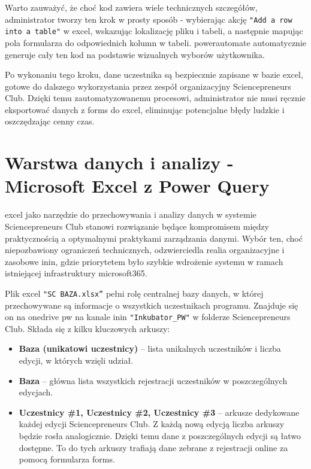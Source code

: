 Warto zauważyć, że choć kod zawiera wiele technicznych szczegółów, administrator tworzy ten krok w prosty sposób - wybierając akcję \texttt{"Add a row into a table"} w \gls{excel}, wskazując lokalizację pliku i tabeli, a następnie mapując pola formularza do odpowiednich kolumn w tabeli. \gls{powerautomate} automatycznie generuje cały ten kod na podstawie wizualnych wyborów użytkownika.

Po wykonaniu tego kroku, dane uczestnika są bezpiecznie zapisane w bazie \gls{excel}, gotowe do dalszego wykorzystania przez zespół organizacyjny Sciencepreneurs Club. Dzięki temu zautomatyzowanemu procesowi, administrator nie musi ręcznie eksportować danych z \gls{forms} do \gls{excel}, eliminując potencjalne błędy ludzkie i oszczędzając cenny czas.


\section{Warstwa danych i analizy - Microsoft Excel z Power Query}

\gls{excel} jako narzędzie do przechowywania i analizy danych w systemie Sciencepreneurs Club stanowi rozwiązanie będące kompromisem między praktycznością a optymalnymi praktykami zarządzania danymi. Wybór ten, choć niepozbawiony ograniczeń technicznych, odzwierciedla realia organizacyjne i zasobowe \gls{inin}, gdzie priorytetem było szybkie wdrożenie systemu w ramach istniejącej infrastruktury \gls{microsoft365}.

Plik \gls{excel} \texttt{"SC BAZA.xlsx”} pełni rolę centralnej bazy danych, w której przechowywane są informacje o wszystkich uczestnikach programu. Znajduje się on na \gls{onedrive} \gls{pw} na kanale \gls{inin} \texttt{"Inkubator\_PW"} w folderze Sciencepreneurs Club. Składa się z kilku kluczowych arkuszy:

\begin{itemize}
    \item \textbf{Baza (unikatowi uczestnicy)} – lista unikalnych uczestników i liczba edycji, w których wzięli udział.
    \item \textbf{Baza} – główna lista wszystkich rejestracji uczestników w poszczególnych edycjach.
    \item \textbf{Uczestnicy \#1, Uczestnicy \#2, Uczestnicy \#3} – arkusze dedykowane każdej edycji Sciencepreneurs Club. Z każdą nową edycją liczba arkuszy będzie rosła analogicznie. Dzięki temu dane z poszczególnych edycji są łatwo dostępne. To do tych arkuszy trafiają dane zebrane z rejestracji online za pomocą formularza \gls{forms}. 
\end{itemize}

